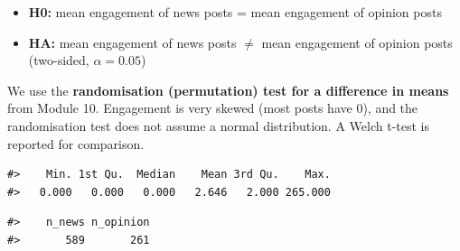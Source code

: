 \documentclass[
  10pt,
]{article}
\newenvironment{Shaded}{\begin{snugshade}}{\end{snugshade}}
\newcommand{\AttributeTok}[1]{\textcolor[rgb]{0.13,0.29,0.53}{#1}}
\newcommand{\CommentTok}[1]{\textcolor[rgb]{0.56,0.35,0.01}{\textit{#1}}}
\newcommand{\DecValTok}[1]{\textcolor[rgb]{0.00,0.00,0.81}{#1}}
\newcommand{\FunctionTok}[1]{\textcolor[rgb]{0.13,0.29,0.53}{\textbf{#1}}}
\newcommand{\NormalTok}[1]{#1}
\newcommand{\OtherTok}[1]{\textcolor[rgb]{0.56,0.35,0.01}{#1}}
\newcommand{\SpecialCharTok}[1]{\textcolor[rgb]{0.81,0.36,0.00}{\textbf{#1}}}
\providecommand{\tightlist}{%
  \setlength{\itemsep}{0pt}\setlength{\parskip}{0pt}}
\begin{document}
\begin{itemize}
\tightlist
\item
  \textbf{H0:} mean engagement of news posts = mean engagement of
  opinion posts
\item
  \textbf{HA:} mean engagement of news posts \(\neq\) mean engagement of
  opinion posts (two-sided, \(\alpha = 0.05\))
\end{itemize}

We use the \textbf{randomisation (permutation) test for a difference in
means} from Module 10. Engagement is very skewed (most posts have 0),
and the randomisation test does not assume a normal distribution. A
Welch t-test is reported for comparison.

\begin{Shaded}
\end{Shaded}

\begin{verbatim}
#>    Min. 1st Qu.  Median    Mean 3rd Qu.    Max. 
#>   0.000   0.000   0.000   2.646   2.000 265.000
\end{verbatim}

\begin{Shaded}
\end{Shaded}

\begin{verbatim}
#>    n_news n_opinion 
#>       589       261
\end{verbatim}
\end{document}
